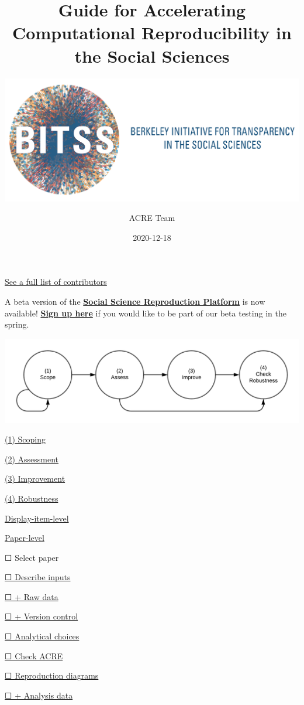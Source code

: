 \documentclass[]{book}
\title{Guide for Accelerating Computational Reproducibility in the Social Sciences}
\subtitle{\href{https://www.bitss.org/}{\includegraphics{BITSS_logo_horizontal.png}}\\}
\author{ACRE Team}
\date{2020-12-18}
\begin{document}
\maketitle

{
\setcounter{tocdepth}{1}
\tableofcontents
}
\hypertarget{section}{%
\chapter*{}\label{section}}

\protect\hyperlink{contributions}{See a full list of contributors}

A beta version of the \href{https://www.socialsciencereproduction.org/}{\textbf{Social Science Reproduction Platform}} is now available! \href{https://forms.gle/yZivWcwijCzEhrBU6}{\textbf{Sign up here}} if you would like to be part of our beta testing in the spring.

\includegraphics[width=1\linewidth]{stages}

\protect\hyperlink{scoping}{(1) Scoping}

\protect\hyperlink{assessment}{(2) Assessment}

\protect\hyperlink{improvements}{(3) Improvement}

\protect\hyperlink{robust}{(4) Robustness}

\protect\hyperlink{di-imp}{Display-item-level}

\protect\hyperlink{paper-level}{Paper-level}

☐ Select paper

\protect\hyperlink{describe-inputs}{☐ Describe inputs}

\protect\hyperlink{rd}{☐ + Raw data}

\protect\hyperlink{paper-level}{☐ + Version control}

\protect\hyperlink{id-analy}{☐ Analytical choices}

\protect\hyperlink{check-acre}{☐ Check ACRE}

\protect\hyperlink{diagram}{☐ Reproduction diagrams}

\protect\hyperlink{ad}{☐ + Analysis data}
\end{document}
